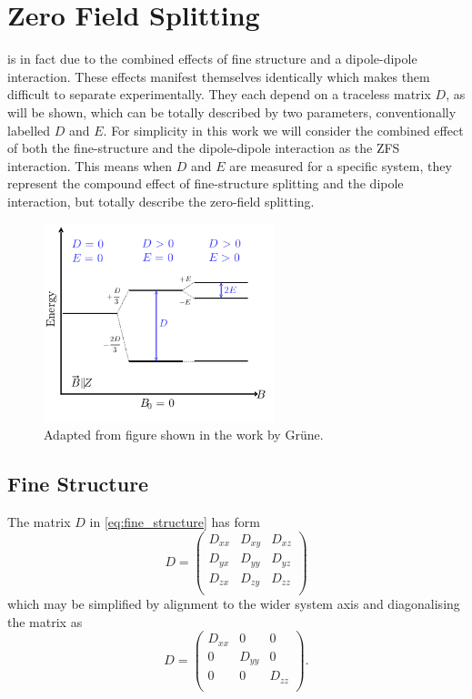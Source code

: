\section{Zero Field Splitting}\label{zfs}
 is in fact due to the combined effects of fine structure and a dipole-dipole interaction. These effects manifest themselves identically which makes them difficult to separate experimentally. They each depend on a traceless matrix $D$, as will be shown, which can be totally described by two parameters, conventionally labelled $D$ and $E$. 
For simplicity in this work we will consider the combined effect of both the fine-structure and the dipole-dipole interaction as the ZFS interaction. This means when $D$ and $E$ are measured for a specific system, they represent the compound effect of fine-structure splitting and the dipole interaction, but totally describe the zero-field splitting. 

\begin{figure}[H]
    \begin{center}
        \includegraphics[width=0.6\textwidth]{figures/ZFS.pdf}
    \end{center}
    \caption{Adapted from figure shown in the work by Gr\"{u}ne. }\label{fig:ZFS}
\end{figure}



\subsection{Fine Structure}
The matrix $D$ in \eqref{eq:fine_structure} has form 
\begin{equation}
   D = \begin{pmatrix}
       D_{xx} & D_{xy} & D_{xz} \\ 
       D_{yx} & D_{yy} & D_{yz} \\ 
       D_{zx} & D_{zy} & D_{zz} \\ 
   \end{pmatrix} 
\end{equation}
which may be simplified by alignment to the wider system axis and diagonalising the matrix as 
\begin{equation}
   D = \begin{pmatrix}
       D_{xx} & 0 & 0 \\ 
       0 & D_{yy} & 0 \\ 
       0 & 0 & D_{zz} \\ 
   \end{pmatrix}.
    \label{eq:fine_splitting_D}
\end{equation}

